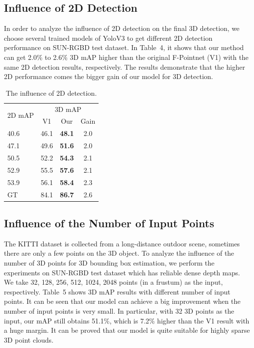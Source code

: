 \documentclass[letterpaper]{article}
\begin{document}
\subsection{Influence of 2D Detection}

In order to analyze the influence of 2D detection on the final 3D detection, we choose several trained models of YoloV3 to get different 2D detection performance on SUN-RGBD test dataset. In Table~4, it shows that our method can get 2.0\% to 2.6\% 3D mAP higher than the original F-Pointnet (V1) with the same 2D detection results, respectively. The results demonstrate that the higher 2D performance comes the bigger gain of our model for 3D detection.

\begin{table}[h]
\scriptsize
\begin{center}
\begin{adjustbox}{width=0.16\columnwidth}
\begin{tabular} {l|c|c|c}
\hline
\multirow{2}{*}{2D mAP} & \multicolumn{3}{c}{3D mAP} \\
\cline{2-4}& V1 & Our  &Gain\\
\hline
\hline
40.6 		     & 46.1 &\textbf{48.1}   &2.0  \\
47.1 		     & 49.6 &\textbf{51.6}   &2.0  \\
50.5 	         & 52.2 &\textbf{54.3}   &2.1  \\
52.9 	         & 55.5 &\textbf{57.6}   &2.1  \\
53.9 			 & 56.1 &\textbf{58.4}   &2.3  \\
GT			     & 84.1 &\textbf{86.7}   &2.6  \\
\hline
\end{tabular}
\end{adjustbox}
\end{center}
\caption{The influence of 2D detection.}
\label{tab:Influence of 2D Detection}
\end{table}

\subsection{Influence of the Number of Input Points}
The KITTI dataset is collected from a long-distance outdoor scene, sometimes there are only a few points on the 3D object. To analyze the influence of the number of 3D points for 3D bounding box estimation, we perform the experiments on SUN-RGBD test dataset which has reliable dense depth maps. We take 32, 128, 256, 512, 1024, 2048 points (in a frustum) as the input, respectively. Table~5 shows 3D mAP results with different number of input points. It can be seen that our model can achieve a big improvement when the number of input points is very small. In particular, with 32 3D points as the input, our mAP still obtains 51.1\%,  which is 7.2\% higher than the V1 result with a huge margin. It can be proved that our model is quite suitable for highly sparse 3D point clouds.
\end{document}
